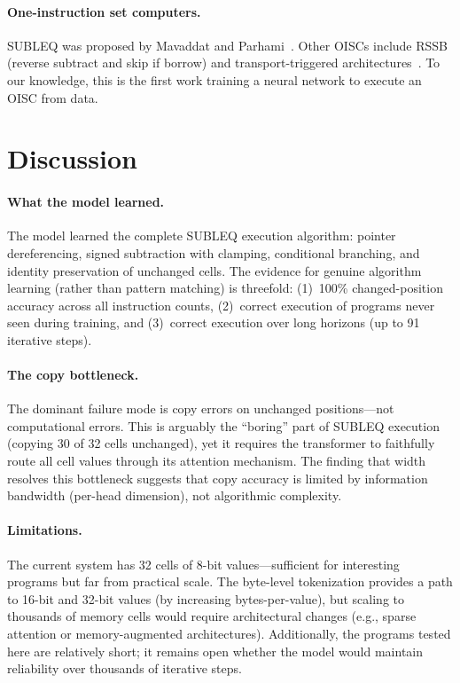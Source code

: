 \documentclass[11pt,a4paper]{article}
\begin{document}
\paragraph{One-instruction set computers.}
SUBLEQ was proposed by Mavaddat and Parhami~\cite{mavaddat1988}.
Other OISCs include RSSB (reverse subtract and skip if borrow) and transport-triggered architectures~\cite{jones2005oisc}.
To our knowledge, this is the first work training a neural network to execute an OISC from data.

\section{Discussion}
\label{sec:discussion}

\paragraph{What the model learned.}
The model learned the complete SUBLEQ execution algorithm: pointer dereferencing, signed subtraction with clamping, conditional branching, and identity preservation of unchanged cells.
The evidence for genuine algorithm learning (rather than pattern matching) is threefold:
(1)~100\% changed-position accuracy across all instruction counts,
(2)~correct execution of programs never seen during training,
and (3)~correct execution over long horizons (up to 91 iterative steps).

\paragraph{The copy bottleneck.}
The dominant failure mode is copy errors on unchanged positions---not computational errors.
This is arguably the ``boring'' part of SUBLEQ execution (copying 30 of 32 cells unchanged), yet it requires the transformer to faithfully route all cell values through its attention mechanism.
The finding that width resolves this bottleneck suggests that copy accuracy is limited by information bandwidth (per-head dimension), not algorithmic complexity.

\paragraph{Limitations.}
The current system has 32 cells of 8-bit values---sufficient for interesting programs but far from practical scale.
The byte-level tokenization provides a path to 16-bit and 32-bit values (by increasing bytes-per-value), but scaling to thousands of memory cells would require architectural changes (e.g., sparse attention or memory-augmented architectures).
Additionally, the programs tested here are relatively short; it remains open whether the model would maintain reliability over thousands of iterative steps.
\end{document}
